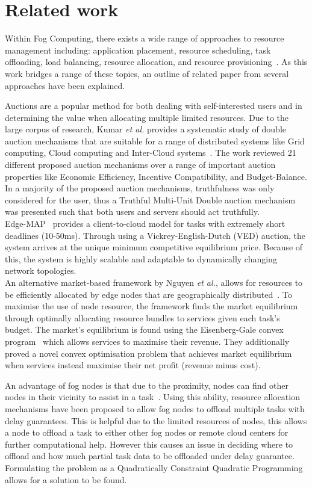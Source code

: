 \section{Related work}
\label{sec:related-work}
Within Fog Computing, there exists a wide range of approaches to resource management including:
application placement, resource scheduling, task offloading, load balancing, resource allocation,
and resource provisioning~\cite{ghobaei2019resource}. As this work bridges a range of these topics, an outline of
related paper from several approaches have been explained.

Auctions are a popular method for both dealing with self-interested users and in determining the value when allocating
multiple limited resources. Due to the large corpus of research, Kumar \emph{et al.} provides a systematic study of double
auction mechanisms that are suitable for a range of distributed systems like Grid computing, Cloud computing and Inter-Cloud
systems~\cite{KUMAR2017234}. The work reviewed 21 different proposed auction mechanisms over a range of important auction
properties like Economic Efficiency, Incentive Compatibility, and Budget-Balance. In a majority of the proposed auction
mechanisms, truthfulness was only considered for the user, thus a Truthful Multi-Unit Double auction mechanism was
presented such that both users and servers should act truthfully. \\
Edge-MAP~\cite{tasiopoulos2018edge} provides a client-to-cloud model for tasks with extremely short deadlines
(10-50ms). Through using a Vickrey-English-Dutch (VED) auction, the system arrives at the unique minimum competitive
equilibrium price. Because of this, the system is highly scalable and adaptable to dynamically changing network
topologies. \\
An alternative market-based framework by Nguyen \emph{et al.}, allows for resources to be efficiently allocated by edge nodes
that are geographically distributed~\cite{8373684}. To maximise the use of node resource, the framework finds the market
equilibrium through optimally allocating resource bundles to services given each task's budget. The market's
equilibrium is found using the Eisenberg-Gale convex program~\cite{JAIN201084} which allows services to maximise their revenue. They
additionally proved a novel convex optimisation problem that achieves market equilibrium when services instead maximise
their net profit (revenue minus cost).

An advantage of fog nodes is that due to the proximity, nodes can find other nodes in their vicinity to assist in a
task~\cite{8839780}. Using this ability, resource allocation mechanisms have been proposed to allow fog nodes to offload
multiple tasks with delay guarantees. This is helpful due to the limited resources of nodes, this allows a node to
offload a task to either other fog nodes or remote cloud centers for further computational help. However this causes an
issue in deciding where to offload and how much partial task data to be offloaded under delay guarantee. Formulating
the problem as a Quadratically Constraint Quadratic Programming allows for a solution to be found.


